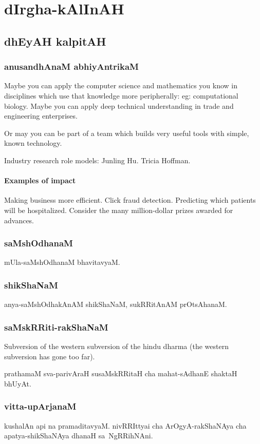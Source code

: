\documentclass[oneside, article]{memoir}
\begin{document}
\section{dIrgha-kAlInAH}
\subsection{dhEyAH kalpitAH}
\subsubsection{anusandhAnaM abhiyAntrikaM}
Maybe you can apply the computer science and mathematics you know in disciplines which use that knowledge more peripherally: eg: computational biology. Maybe you can apply deep technical understanding in trade and engineering enterprises.

Or may you can be part of a team which builds very useful tools with simple, known technology.

Industry research role models: Junling Hu. Tricia Hoffman.

\paragraph{Examples of impact}
Making business more efficient. Click fraud detection. Predicting which patients will be hospitalized. Consider the many million-dollar prizes awarded for advances.

\subsubsection{saMshOdhanaM}
mUla-saMshOdhanaM bhavitavyaM.

\subsubsection{shikShaNaM}
anya-saMshOdhakAnAM shikShaNaM, sukRRitAnAM prOtsAhanaM.

\subsubsection{saMskRRiti-rakShaNaM}
Subversion of the western subversion of the hindu dharma (the western subversion has gone too far).

prathamaM sva-parivAraH susaMskRRitaH cha mahat-sAdhanE shaktaH bhUyAt.

\subsubsection{vitta-upArjanaM}
kushalAn api na pramaditavyaM. nivRRIttyai cha ArOgyA-rakShaNAya cha apatya-shikShaNAya dhanaH sa~NgRRihNAni.
\end{document}

